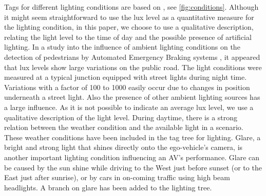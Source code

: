 Tags for different lighting conditions are based on \cite{golob2003relationships}, see \cref{fig:conditions}. Although it might seem straightforward to use the lux level as a quantitative measure for the lighting condition, in this paper, we choose to use a qualitative description, relating the light level to the time of day and the possible presence of artificial lighting. In a study into the influence of ambient lighting conditions on the detection of pedestrians by Automated Emergency Braking systems \autocite{wouters2013influence}, it appeared that lux levels show large variations on the public road. 
The light conditions were measured at a typical junction equipped with street lights during night time. Variations with a factor of 100 to 1000 easily occur due to changes in position underneath a street light. 
Also the presence of other ambient lighting sources has a large influence. As it is not possible to indicate an average lux level, we use a qualitative description of the light level. 
During daytime, there is a strong relation between the weather condition and the available light in a scenario. These weather conditions have been included in the tag tree for lighting.
Glare, a bright and strong light that shines directly onto the ego-vehicle's camera, is another important lighting condition influencing an AV's performance. Glare can be caused by the sun shine while driving to the West just before sunset (or to the East just after sunrise), or by cars in on-coming traffic using high beam headlights. A branch on glare has been added to the lighting tree.  

